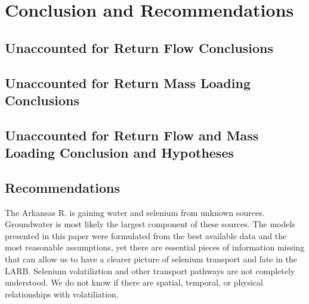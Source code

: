 \chapter{Conclusion and Recommendations}
\label{chap:Conclusion}

\begin{linenumbers}
\section{Unaccounted for Return Flow Conclusions}
\label{sec:ReturnFlowConclusions}

\clearpage{}
\section{Unaccounted for Return Mass Loading Conclusions}
\label{sec:ReturnMassConclusions}

\clearpage{}
\section{Unaccounted for Return Flow and Mass Loading Conclusion and Hypotheses}
\label{sec:FlowAndMassConclusions}

\clearpage{}
\section{Recommendations}
\label{sec:Recommendations}

The Arkansas R. is gaining water and selenium from unknown sources.  Groundwater is most likely the largest component of these sources.  The models presented in this paper were formulated from the best available data and the most reasonable assumptions, yet there are essential pieces of information missing that can allow us to have a clearer picture of selenium transport and fate in the LARB.  Selenium volatiliztion and other transport pathways are not completely understood.  We do not know if there are spatial, temporal, or physical relationships with volatiliation.


\end{linenumbers}
